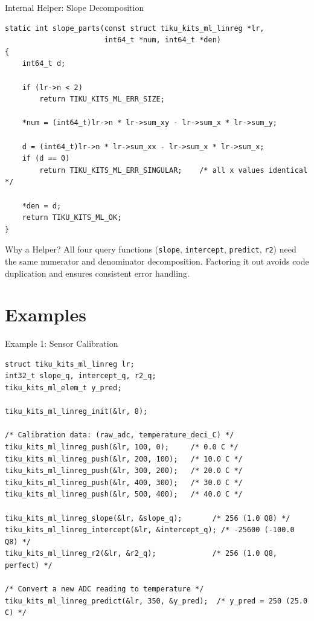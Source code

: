 \documentclass[aspectratio=169, 10pt]{beamer}
\begin{document}
\begin{frame}[fragile]{Internal Helper: Slope Decomposition}
\begin{lstlisting}[style=cstyle,
  title={slope\_parts --- shared by slope, intercept, predict, r2}]
static int slope_parts(const struct tiku_kits_ml_linreg *lr,
                       int64_t *num, int64_t *den)
{
    int64_t d;

    if (lr->n < 2)
        return TIKU_KITS_ML_ERR_SIZE;

    *num = (int64_t)lr->n * lr->sum_xy - lr->sum_x * lr->sum_y;

    d = (int64_t)lr->n * lr->sum_xx - lr->sum_x * lr->sum_x;
    if (d == 0)
        return TIKU_KITS_ML_ERR_SINGULAR;    /* all x values identical */

    *den = d;
    return TIKU_KITS_ML_OK;
}
\end{lstlisting}

\vspace{0.3em}
\begin{block}{Why a Helper?}
All four query functions (\texttt{slope}, \texttt{intercept}, \texttt{predict},
\texttt{r2}) need the same numerator and denominator decomposition.
Factoring it out avoids code duplication and ensures consistent error handling.
\end{block}
\end{frame}

\section{Examples}

\begin{frame}[fragile]{Example 1: Sensor Calibration}
\begin{lstlisting}[style=cstyle,
  title={examples/example\_ml\_linreg.c --- ADC to temperature}]
struct tiku_kits_ml_linreg lr;
int32_t slope_q, intercept_q, r2_q;
tiku_kits_ml_elem_t y_pred;

tiku_kits_ml_linreg_init(&lr, 8);

/* Calibration data: (raw_adc, temperature_deci_C) */
tiku_kits_ml_linreg_push(&lr, 100, 0);     /* 0.0 C */
tiku_kits_ml_linreg_push(&lr, 200, 100);   /* 10.0 C */
tiku_kits_ml_linreg_push(&lr, 300, 200);   /* 20.0 C */
tiku_kits_ml_linreg_push(&lr, 400, 300);   /* 30.0 C */
tiku_kits_ml_linreg_push(&lr, 500, 400);   /* 40.0 C */

tiku_kits_ml_linreg_slope(&lr, &slope_q);       /* 256 (1.0 Q8) */
tiku_kits_ml_linreg_intercept(&lr, &intercept_q); /* -25600 (-100.0 Q8) */
tiku_kits_ml_linreg_r2(&lr, &r2_q);             /* 256 (1.0 Q8, perfect) */

/* Convert a new ADC reading to temperature */
tiku_kits_ml_linreg_predict(&lr, 350, &y_pred);  /* y_pred = 250 (25.0 C) */
\end{lstlisting}
\end{frame}
\end{document}
